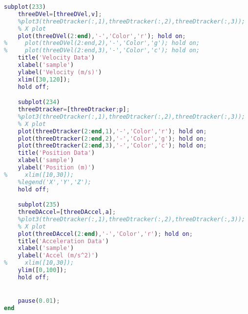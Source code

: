 \documentclass{IEEEtran}
\begin{document}
\begin{lstlisting}[caption={MATLAB Ball Bounce Tracking Demo},label={lst:bounceDemo},language=MATLAB]
    subplot(233)
    threeDVel=[threeDVel,v];
    %plot3(threeDtracker(:,1),threeDtracker(:,2),threeDtracker(:,3));
    % X plot
    plot(threeDVel(2:end),'-','Color','r'); hold on;
%     plot(threeDVel(2:end,2),'-','Color','g'); hold on;
%     plot(threeDVel(2:end,3),'-','Color','c'); hold on;
    title('Velocity Data')
    xlabel('sample')
    ylabel('Velocity (m/s)')
    xlim([30,120]);
    hold off;

    subplot(234)
    threeDtracker=[threeDtracker;p];
    %plot3(threeDtracker(:,1),threeDtracker(:,2),threeDtracker(:,3));
    % X plot
    plot(threeDtracker(2:end,1),'-','Color','r'); hold on;
    plot(threeDtracker(2:end,2),'-','Color','g'); hold on;
    plot(threeDtracker(2:end,3),'-','Color','c'); hold on;
    title('Position Data')
    xlabel('sample')
    ylabel('Position (m)')
%     xlim([10,30]);
    %legend('X','Y','Z');
    hold off;

    subplot(235)
    threeDAccel=[threeDAccel,a];
    %plot3(threeDtracker(:,1),threeDtracker(:,2),threeDtracker(:,3));
    % X plot
    plot(threeDAccel(2:end),'-','Color','r'); hold on;
    title('Acceleration Data')
    xlabel('sample')
    ylabel('Accel (m/s^2)')
%     xlim([10,30]);
    ylim([0,100]);
    hold off;


    pause(0.01);
end
\end{lstlisting}
\end{document}
